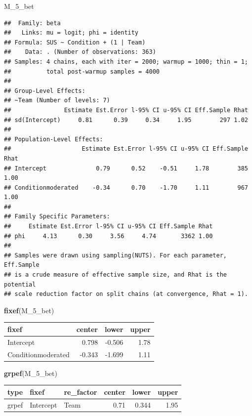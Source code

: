 \documentclass[]{svmono}
\newenvironment{Shaded}{\begin{snugshade}}{\end{snugshade}}
\newcommand{\KeywordTok}[1]{\textcolor[rgb]{0.13,0.29,0.53}{\textbf{#1}}}
\newcommand{\NormalTok}[1]{#1}
\theoremstyle{definition}
\theoremstyle{definition}
\theoremstyle{definition}
\theoremstyle{remark}
\begin{document}
\begin{Shaded}
\begin{Highlighting}[]
\NormalTok{M_5_bet}
\end{Highlighting}
\end{Shaded}

\begin{verbatim}
##  Family: beta 
##   Links: mu = logit; phi = identity 
## Formula: SUS ~ Condition + (1 | Team) 
##    Data: . (Number of observations: 363) 
## Samples: 4 chains, each with iter = 2000; warmup = 1000; thin = 1;
##          total post-warmup samples = 4000
## 
## Group-Level Effects: 
## ~Team (Number of levels: 7) 
##               Estimate Est.Error l-95% CI u-95% CI Eff.Sample Rhat
## sd(Intercept)     0.81      0.39     0.34     1.95        297 1.02
## 
## Population-Level Effects: 
##                    Estimate Est.Error l-95% CI u-95% CI Eff.Sample Rhat
## Intercept              0.79      0.52    -0.51     1.78        385 1.00
## Conditionmoderated    -0.34      0.70    -1.70     1.11        967 1.00
## 
## Family Specific Parameters: 
##     Estimate Est.Error l-95% CI u-95% CI Eff.Sample Rhat
## phi     4.13      0.30     3.56     4.74       3362 1.00
## 
## Samples were drawn using sampling(NUTS). For each parameter, Eff.Sample 
## is a crude measure of effective sample size, and Rhat is the potential 
## scale reduction factor on split chains (at convergence, Rhat = 1).
\end{verbatim}

\begin{Shaded}
\begin{Highlighting}[]
\KeywordTok{fixef}\NormalTok{(M_5_bet)}
\end{Highlighting}
\end{Shaded}

\begin{longtable}[]{@{}lrrr@{}}
\toprule
fixef & center & lower & upper\tabularnewline
\midrule
\endhead
Intercept & 0.798 & -0.506 & 1.78\tabularnewline
Conditionmoderated & -0.343 & -1.699 & 1.11\tabularnewline
\bottomrule
\end{longtable}

\begin{Shaded}
\begin{Highlighting}[]
\KeywordTok{grpef}\NormalTok{(M_5_bet)}
\end{Highlighting}
\end{Shaded}

\begin{longtable}[]{@{}lllrrr@{}}
\toprule
type & fixef & re\_factor & center & lower & upper\tabularnewline
\midrule
\endhead
grpef & Intercept & Team & 0.71 & 0.344 & 1.95\tabularnewline
\bottomrule
\end{longtable}
\end{document}
